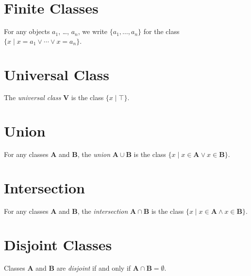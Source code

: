 \section{Finite Classes}

\begin{definition}
    For any objects $a_1$, \ldots, $a_n$, we write $\{ a_1, \ldots, a_n \}$
    for the class $\{ x \mid x = a_1 \vee \cdots \vee x = a_n \}$.
\end{definition}

\section{Universal Class}

\begin{definition}
    The \emph{universal class} $\mathbf{V}$ is the class $\{ x \mid \top \}$.
\end{definition}

\section{Union}

\begin{definition}[Union]
    For any classes $\mathbf{A}$ and $\mathbf{B}$, the \emph{union}
    $\mathbf{A} \cup \mathbf{B}$ is the class $\{ x \mid x \in \mathbf{A} \vee
    x \in \mathbf{B} \}$.
\end{definition}

\section{Intersection}

\begin{definition}[Intersection]
    For any classes $\mathbf{A}$ and $\mathbf{B}$, the \emph{intersection}
    $\mathbf{A} \cap \mathbf{B}$ is the class $\{ x \mid x \in \mathbf{A} \wedge
    x \in \mathbf{B} \}$.
\end{definition}

\section{Disjoint Classes}

\begin{definition}[Disjoint]
    Classes $\mathbf{A}$ and $\mathbf{B}$ are \emph{disjoint} if and only if
    $\mathbf{A} \cap \mathbf{B} = \emptyset$.
\end{definition}

